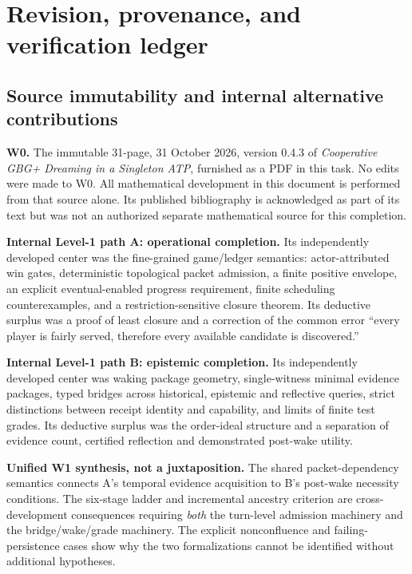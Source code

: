 \documentclass[11pt,letterpaper]{article}
\begin{document}
\appendix
\section{Revision, provenance, and verification ledger}\label{gl-first-W1-s13}
\subsection{Source immutability and internal alternative contributions}
\noindent\textbf{W0.} The immutable 31-page, 31 October 2026, version 0.4.3 of \emph{Cooperative GBG+ Dreaming in a Singleton ATP}, furnished as a PDF in this task. No edits were made to W0. All mathematical development in this document is performed from that source alone. Its published bibliography is acknowledged as part of its text but was not an authorized separate mathematical source for this completion.

\medskip\noindent\textbf{Internal Level-1 path A: operational completion.} Its independently developed center was the fine-grained game/ledger semantics: actor-attributed win gates, deterministic topological packet admission, a finite positive envelope, an explicit eventual-enabled progress requirement, finite scheduling counterexamples, and a restriction-sensitive closure theorem. Its deductive surplus was a proof of least closure and a correction of the common error ``every player is fairly served, therefore every available candidate is discovered.''

\medskip\noindent\textbf{Internal Level-1 path B: epistemic completion.} Its independently developed center was waking package geometry, single-witness minimal evidence packages, typed bridges across historical, epistemic and reflective queries, strict distinctions between receipt identity and capability, and limits of finite test grades. Its deductive surplus was the order-ideal structure and a separation of evidence count, certified reflection and demonstrated post-wake utility.

\medskip\noindent\textbf{Unified W1 synthesis, not a juxtaposition.} The shared packet-dependency semantics connects A's temporal evidence acquisition to B's post-wake necessity conditions. The six-stage ladder and incremental ancestry criterion are cross-development consequences requiring \emph{both} the turn-level admission machinery and the bridge/wake/grade machinery. The explicit nonconfluence and failing-persistence cases show why the two formalizations cannot be identified without additional hypotheses.
\end{document}
